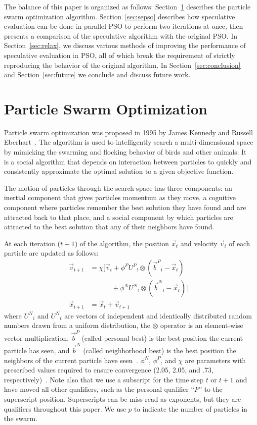 \documentclass[journal,letterpaper]{IEEEtran}
\renewcommand{\sec}[1]{Section~\ref{sec:#1}}
\providecommand{\pers}{\ensuremath{P}}
\providecommand{\neigh}{\ensuremath{N}}
\providecommand{\nURand}{\ensuremath{U^\neigh}}
\providecommand{\pURand}{\ensuremath{U^\pers}}
\providecommand{\ppos}{\ensuremath{\Vec{x}}}
\providecommand{\pvel}{\ensuremath{\Vec{v}}}
\providecommand{\nbest}{\ensuremath{\Vec{b}^\neigh}}
\providecommand{\pbest}{\ensuremath{\Vec{b}^\pers}}
\providecommand{\constriction}{\ensuremath{\chi}}
\providecommand{\ncoeff}{\ensuremath{\phi^\neigh}}
\providecommand{\pcoeff}{\ensuremath{\phi^\pers}}
\begin{document}
The balance of this paper is organized as follows:
\sec{pso} describes the particle swarm optimization algorithm.
\sec{sepso}
describes how speculative evaluation can be done in parallel PSO to
perform two iterations at once, then presents a comparison of the speculative
algorithm with the original PSO.  In \sec{relax}, we discuss various methods of
improving the performance of speculative evaluation in PSO, all of which break
the requirement of strictly reproducing the behavior of the original algorithm.
In \sec{conclusion} and \sec{future} we conclude and discuss future work.

\section{Particle Swarm Optimization}
\label{sec:pso}

Particle swarm optimization was proposed in 1995 by James Kennedy and Russell
Eberhart~\cite{kennedy-icnn95}.  The algorithm is used to intelligently search
a multi-dimensional space by mimicking the swarming and flocking behavior of
birds and other animals. It is a social algorithm that depends on interaction
between particles to quickly and consistently approximate the optimal solution to a
given objective function.

The motion of particles through the search space has three components: an
inertial component that gives particles momentum as they move, a cognitive
component where particles remember the best solution they have found and are
attracted back to that place, and a social component by which particles are
attracted to the best solution that any of their neighbors have found.

At each iteration ($t+1$) of the algorithm, the position $\ppos_t$ and velocity
$\pvel_t$ of each particle are updated as follows:
\begin{align}
\nonumber
	\pvel_{t+1} &=
		\constriction \bigl[ \pvel_t
			+ \pcoeff\pURand_{t}\otimes(\pbest_{t} - \ppos_{t}) \\
\label{eq:velupdate}
			& \quad \quad \quad \, + \ncoeff\nURand_{t}\otimes(\nbest_{t} - \ppos_{t})
		\bigr] \\
\label{eq:posupdate}
	\ppos_{t+1} &= \ppos_{t} + \pvel_{t+1}
\end{align}
where \( \nURand_{t} \) and \( \nURand_{t} \) are vectors of independent
and identically distributed random numbers drawn from a uniform
distribution, the \( \otimes \) operator is an element-wise vector
multiplication, $\pbest$ (called personal best) is the best position the
current particle has seen, and $\nbest$ (called neighborhood best) is the best
position the neighbors of the current particle have seen~\cite{bratton-sis07}.  \( \ncoeff \), \(
\pcoeff \), and \( \constriction \) are parameters with prescribed values
required to ensure convergence (2.05, 2.05, and .73,
respectively)~\cite{clerc-tec02}. Note also that we use a subscript for the 
time step $t$ or $t+1$ and have moved all other qualifiers,
such as the personal qualifier ``$\pers$'' to the superscript position.
Superscripts can be miss read as exponents, but they are qualifiers throughout this paper.
We use $p$ to indicate the number of particles in the swarm.
\end{document}
